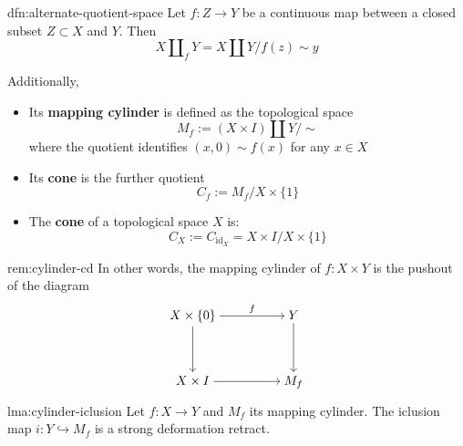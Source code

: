 \documentclass{article}
\begin{document}
\begin{dfn}{dfn:alternate-quotient-space}{}
    Let $f : Z \to Y$ be a continuous map between a closed subset $Z \subset X$ and $Y$. Then
    \[X \amalg_{f} Y = X \amalg Y / f(z) \sim y\]

    Additionally,
    \begin{itemize}
        \item Its \textbf{mapping cylinder} is defined as the topological space
            \[M_{f} := (X \times I) \amalg Y / \sim\]
            where the quotient identifies $(x, 0) \sim f(x)$ for any $x\in X$
        \item Its \textbf{cone} is the further quotient
            \[C_{f} := M_{f} / X \times \{1\}\]
        \item The \textbf{cone} of a topological space $X$ is:
            \[C_{X} := C_{\mathrm{id}_{X}} = X \times I / X \times \{1\}\]
    \end{itemize}
\end{dfn}

\begin{rem}{rem:cylinder-cd}{}
    In other words, the mapping cylinder of $f : X \times Y$ is the pushout of the diagram
\[\begin{tikzcd}[cramped]
	{X \times \{0\}} && Y \\
	\\
	{X \times I} && {M_f}
	\arrow["f", from=1-1, to=1-3]
	\arrow[from=1-1, to=3-1]
	\arrow[from=1-3, to=3-3]
	\arrow[from=3-1, to=3-3]
\end{tikzcd}\]
\end{rem}

\begin{lma}{lma:cylinder-iclusion}{}
    Let $f : X \to Y$ and $M_{f}$ its mapping cylinder. The iclusion map $i : Y \hookrightarrow M_{f}$ is a strong deformation retract.
\end{lma}
\end{document}
